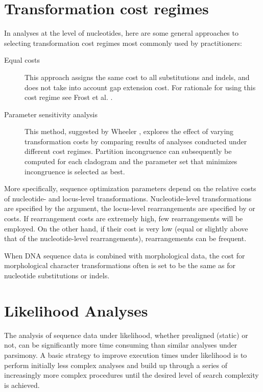 \section{Transformation cost regimes}
In analyses at the level of nucleotides, here are some general
approaches to selecting transformation cost regimes most commonly
used by \poy practitioners:  

\begin{description} 

\item[Equal costs] This approach assigns the same cost to all 
substitutions and indels, and does not take into account gap 
extension cost. For rationale for using this cost regime see 
Frost et al. \cite{frost2001}.
\item[Parameter sensitivity analysis] This method, suggested by
Wheeler \cite{wheeler1995}, explores the effect of varying
transformation costs by comparing results of analyses conducted
under different cost regimes.  Partition incongruence can subsequently
be computed  for each cladogram and the parameter set that minimizes
incongruence is selected as best.  

\end{description} 

More specifically, sequence optimization parameters depend on the 
relative costs of nucleotide- and locus-level transformations.  Nucleotide-level
transformations are specified by the  argument,
the locus-level rearrangements are specified by
 or 
costs. If  rearrangement costs are extremely
high, few rearrangements will be employed. On the other hand, if
their cost is very low (equal or slightly above that of the
nucleotide-level rearrangements), rearrangements can be frequent.

When DNA sequence data is combined with morphological data, the
cost for morphological character transformations often is  set to
be the same as for nucleotide substitutions or indels.

\section{Likelihood Analyses}
The analysis of sequence data under likelihood, whether prealigned
(static) or not, can be significantly more time consuming than
similar analyses under parsimony.  A basic strategy to improve
execution times under likelihood is to perform initially less complex
analyses and build up through a series of increasingly more complex
procedures until the desired level of search complexity is achieved.


